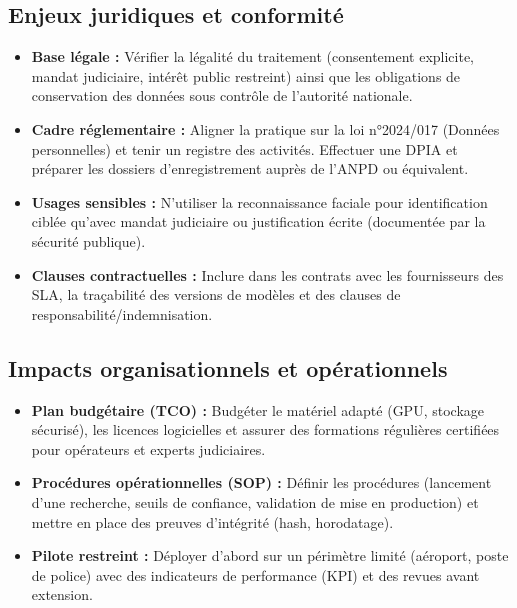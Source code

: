 \documentclass[11pt,a4paper]{article}
\begin{document}
	\subsection{Enjeux juridiques et conformité}
	\begin{itemize}
		\item \textbf{Base légale :} Vérifier la légalité du traitement (consentement explicite, mandat judiciaire, intérêt public restreint) ainsi que les obligations de conservation des données sous contrôle de l’autorité nationale.
		\item \textbf{Cadre réglementaire :} Aligner la pratique sur la loi n°2024/017 (Données personnelles) et tenir un registre des activités. Effectuer une DPIA et préparer les dossiers d’enregistrement auprès de l’ANPD ou équivalent.
		\item \textbf{Usages sensibles :} N’utiliser la reconnaissance faciale pour identification ciblée qu’avec mandat judiciaire ou justification écrite (documentée par la sécurité publique).
		\item \textbf{Clauses contractuelles :} Inclure dans les contrats avec les fournisseurs des SLA, la traçabilité des versions de modèles et des clauses de responsabilité/indemnisation.
	\end{itemize}
	\vspace{0.5cm}
	\subsection{Impacts organisationnels et opérationnels}
	\begin{itemize}
		\item \textbf{Plan budgétaire (TCO) :} Budgéter le matériel adapté (GPU, stockage sécurisé), les licences logicielles et assurer des formations régulières certifiées pour opérateurs et experts judiciaires.
		\item \textbf{Procédures opérationnelles (SOP) :} Définir les procédures (lancement d’une recherche, seuils de confiance, validation de mise en production) et mettre en place des preuves d’intégrité (hash, horodatage).
		\item \textbf{Pilote restreint :} Déployer d’abord sur un périmètre limité (aéroport, poste de police) avec des indicateurs de performance (KPI) et des revues avant extension.
	\end{itemize}
	\vspace{0.5cm}
\end{document}
